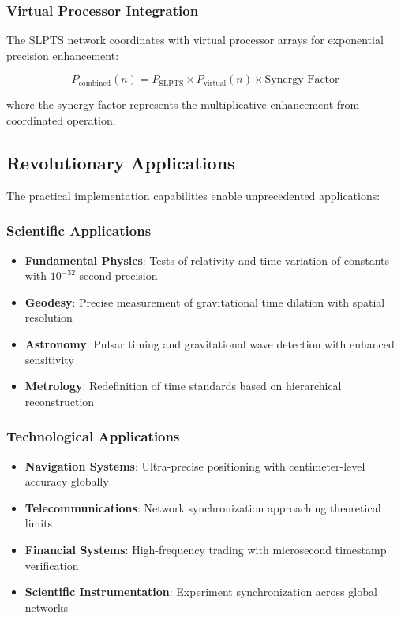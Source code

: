 \documentclass[12pt,a4paper]{article}
\begin{document}
{\subsubsection{Virtual Processor Integration}

The SLPTS network coordinates with virtual processor arrays for exponential precision enhancement:

\begin{equation}
P_{\text{combined}}(n) = P_{\text{SLPTS}} \times P_{\text{virtual}}(n) \times \text{Synergy\_Factor}
\end{equation}

where the synergy factor represents the multiplicative enhancement from coordinated operation.

\subsection{Revolutionary Applications}

The practical implementation capabilities enable unprecedented applications:

\subsubsection{Scientific Applications}

\begin{itemize}
\item \textbf{Fundamental Physics}: Tests of relativity and time variation of constants with $10^{-32}$ second precision
\item \textbf{Geodesy}: Precise measurement of gravitational time dilation with spatial resolution
\item \textbf{Astronomy}: Pulsar timing and gravitational wave detection with enhanced sensitivity
\item \textbf{Metrology}: Redefinition of time standards based on hierarchical reconstruction
\end{itemize}

\subsubsection{Technological Applications}

\begin{itemize}
\item \textbf{Navigation Systems}: Ultra-precise positioning with centimeter-level accuracy globally
\item \textbf{Telecommunications}: Network synchronization approaching theoretical limits
\item \textbf{Financial Systems}: High-frequency trading with microsecond timestamp verification
\item \textbf{Scientific Instrumentation}: Experiment synchronization across global networks
\end{itemize}

}
\end{document}
